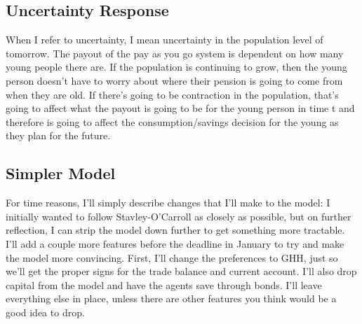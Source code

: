 \documentclass[dvips,12pt]{article}
\begin{document}
\newpage

\subsection{Uncertainty Response}

When I refer to uncertainty, I mean uncertainty in the population level of tomorrow. The payout of the pay as you go system is dependent on how many young people there are. If the population is continuing to grow, then the young person doesn't have to worry about where their pension is going to come from when they are old. If there's going to be contraction in the population, that's going to affect what the payout is going to be for the young person in time t and therefore is going to affect the consumption/savings decision for the young as they plan for the future.


\subsection{Simpler Model}
For time reasons, I'll simply describe changes that I'll make to the model: I initially wanted to follow Stavley-O'Carroll as closely as possible, but on further reflection, I can strip the model down further to get something more tractable. I'll add a couple more features before the deadline in January to try and make the model more convincing. First, I'll change the preferences to GHH, just so we'll get the proper signs for the trade balance and current account. I'll also drop capital from the model and have the agents save through bonds. I'll leave everything else in place, unless there are other features you think would be a good idea to drop.
\end{document}
